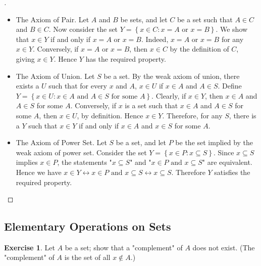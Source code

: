\documentclass[a4paper,11pt]{article}
\theoremstyle{definition}
\newtheorem{exercise}{Exercise}[subsection]
\newenvironment{proofbreak}[1][\proofname]{%
  \begin{proof}[#1]$ $\par\nobreak\ignorespaces
}{%
  \end{proof}
}
\begin{document}
\begin{proofbreak}
  \begin{itemize}
  \item The Axiom of Pair. Let \(A\) and \(B\) be sets, and let \(C\) be a set
    such that \(A \in C\) and \(B \in C\). Now consider the set
    \(Y = \left\{ x \in C : x = A \text{ or } x = B \right\}\). We show that
    \(x \in Y\) if and only if \(x = A\) or \(x = B\). Indeed, \(x = A\) or
    \(x = B\) for any \(x \in Y\). Conversely, if \(x = A\) or \(x = B\), then
    \(x \in C\) by the definition of \(C\), giving \(x \in Y\). Hence \(Y\) has the
    required property.
  \item The Axiom of Union. Let \(S\) be a set. By the weak axiom of union,
    there exists a \(U\) such that for every \(x\) and \(A\), \(x \in U\) if
    \(x \in A\) and \(A \in S\). Define
    \(Y = \left\{ x \in U : x \in A \text{ and } A \in S \text{ for some } A
    \right\}\). Clearly, if \(x \in Y\), then \(x \in A\) and \(A \in S\) for some
    \(A\). Conversely, if \(x\) is a set such that \(x \in A\) and \(A \in S\) for
    some \(A\), then \(x \in U\), by definition. Hence \(x \in Y\). Therefore, for any
    \(S\), there is a \(Y\) such that \(x \in Y\) if and only if \(x \in A\) and
    \(x \in S\) for some \(A\).
  \item The Axiom of Power Set. Let \(S\) be a set, and let \(P\) be the set
    implied by the weak axiom of power set. Consider the set
    \(Y = \left\{ x \in P : x \subseteq S \right\}\). Since \(x \subseteq S\) implies
    \(x \in P\), the statements "\(x \subseteq S\)" and
    "\(x \in P \text{ and } x \subseteq S\)" are equivalent. Hence we have
    \(x \in Y \leftrightarrow x \in P \text{ and } x \subseteq S \leftrightarrow x \subseteq S\). Therefore
    \(Y\) satisfies the required property.
  \end{itemize}
\end{proofbreak}

\subsection{Elementary Operations on Sets}

\setcounter{exercise}{3}

\begin{exercise}
  Let \(A\) be a set; show that a "complement" of \(A\) does not exist. (The
  "complement" of \(A\) is the set of all \(x \notin A\).)
\end{exercise}
\end{document}
